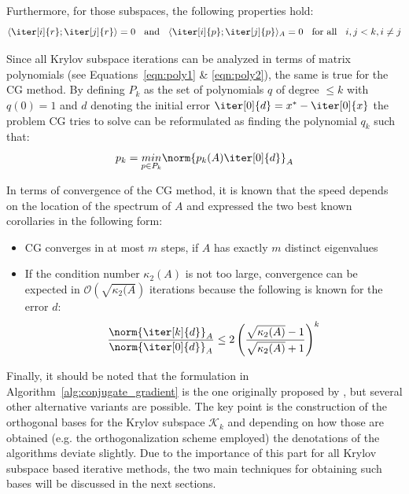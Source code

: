 \noindent Furthermore, for those subspaces, the following properties hold:
\begin{equation}
    \langle\iter[i]{r};\iter[j]{r}\rangle =0 \;\; \text{ and } \;\; \langle\iter[i]{p};\iter[j]{p}\rangle_A =0
    \;\; \text{ for all }\;\; i,j <k, i \neq j
\end{equation}

\noindent Since all Krylov subspace iterations can be analyzed in terms of matrix polynomials (see Equations~\hyperref[eqn:poly1]{\ref{eqn:poly1}} \& \hyperref[eqn:poly2]{\ref{eqn:poly2}}), the same is true for the CG method. By defining $P_k$ as the set of polynomials $q$ of degree $\leq k$ with $q(0)=1$ and $d$ denoting the initial error $\iter[0]{d} = x^*-\iter[0]{x}$ the problem CG tries to solve can be reformulated as finding the polynomial $q_k$ such that:
\begin{equation}
    p_k = \underset{p\in P_k}{min} \norm{p_k(A)\iter[0]{d}}_A
\end{equation}

\noindent In terms of convergence of the CG method, it is known that the speed depends on the location of the spectrum of $A$ and \cite{trefethen_numerical_1997} expressed the two best known corollaries in the following form:
\begin{itemize}
    \item CG converges in at most $m$ steps, if $A$ has exactly $m$ distinct eigenvalues
    \item If the condition number $\kappa_2(A) $ is not too large, convergence can be expected in $\mathcal{O}(\sqrt{\kappa_2(A})$ iterations because the following is known for the error $d$:
\begin{equation}
        \frac{\norm{\iter[k]{d}}_A}{\norm{\iter[0]{d}}_A} \leq 2 \left( \frac{\sqrt{\kappa_2(A)}-1}{\sqrt{\kappa_2(A)}+1}\right)^k
\end{equation}
\end{itemize}

\noindent Finally, it should be noted that the formulation in Algorithm~\hyperref[alg:conjugate_gradient]{\ref{alg:conjugate_gradient}} is the one originally proposed by \cite{hestenes_methods_1952}, but several other alternative variants are possible. The key point is the construction of the orthogonal bases for the Krylov subspace $\mathcal{K}_k$ and depending on how those are obtained (e.g. the orthogonalization scheme employed) the denotations of the algorithms deviate slightly. Due to the importance of this part for all Krylov subspace based iterative methods, the two main techniques for obtaining such bases will be discussed in the next sections.


